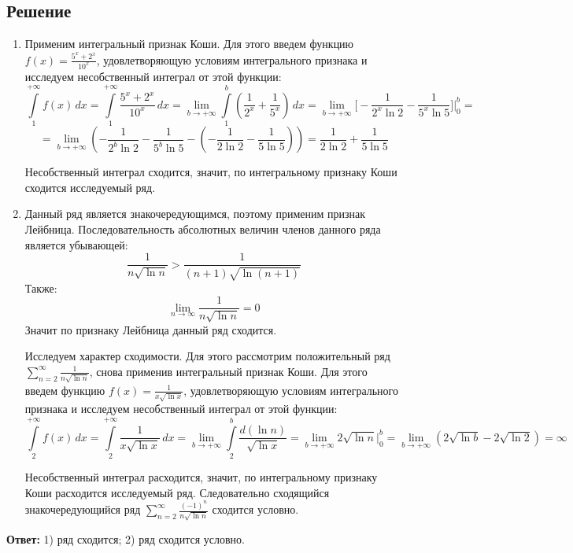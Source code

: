 \documentclass[12pt]{article}
\begin{document}
	\subsection*{Решение}
	\begin{enumerate}[wide, labelwidth=!, labelindent=0pt]
		\item Применим интегральный признак Коши. Для этого введем функцию $ f(x) = \frac{5^x + 2^x}{10^x} $, удовлетворяющую условиям интегрального признака и исследуем несобственный интеграл от этой функции:		
		$$ \int \limits_1^{+ \infty} f(x) \, dx = \int \limits_1^{+ \infty} \frac{5^x + 2^x}{10^x} \, dx = \lim_{b \to + \infty} \int \limits_1^b ( \frac{1}{2^x} + \frac{1}{5^x}) \, dx = \lim_{b \to + \infty} \Big[ - \frac{1}{ 2^x \ln{2} } - \frac{1}{ 5^x \ln{5} } \Big] \Big|_0^b = $$
		$$ = \lim_{b \to + \infty} ( - \frac{1}{ 2^b \ln{2} } - \frac{1}{ 5^b \ln{5} } - (- \frac{1}{ 2 \ln{2} } - \frac{1}{ 5 \ln{5} } ) )  =  \frac{1}{ 2 \ln{2} } + \frac{1}{ 5 \ln{5} }$$

		Несобственный интеграл сходится, значит, по интегральному признаку Коши сходится исследуемый ряд. 

		\item Данный ряд является знакочередующимся, поэтому применим признак Лейбница. Последовательность абсолютных величин членов данного ряда является убывающей:
		$$ \frac{1}{n\sqrt{\ln{n}}} > \frac{1}{(n+1)\sqrt{\ln{(n+1)}}} $$		
		Также:
		$$ \lim_{n \to \infty} \frac{1}{n\sqrt{\ln{n}}} = 0 $$
		Значит по признаку Лейбница данный ряд сходится.

		Исследуем характер сходимости. Для этого рассмотрим положительный ряд $ \sum_{n=2}^{\infty} \frac{1}{n\sqrt{\ln{n}}} $, снова применив интегральный признак Коши. Для этого введем функцию $ f(x) = \frac{1}{x\sqrt{\ln{x}}} $, удовлетворяющую условиям интегрального признака и исследуем несобственный интеграл от этой функции:
		$$ \int \limits_2^{+ \infty} f(x) \, dx = \int \limits_2^{+ \infty} \frac{1}{x\sqrt{\ln{x}}} \, dx = \lim_{b \to + \infty} \int \limits_2^b \frac{d(\ln{n})}{\sqrt{\ln{x}}} = \lim_{b \to + \infty} 2\sqrt{\ln{n}} \Big|_0^b = \lim_{b \to + \infty} ( 2\sqrt{\ln{b}} - 2\sqrt{\ln{2}} ) = \infty $$

		Несобственный интеграл расходится, значит, по интегральному признаку Коши расходится исследуемый ряд. Следовательно сходящийся знакочередующийся ряд $ \sum_{n=2}^{\infty} \frac{(-1)^n}{n\sqrt{\ln{n}}} $ сходится условно. 		
	\end{enumerate}

	\hspace{200pt}\textbf{Ответ:} 1) ряд сходится; 2) ряд сходится условно.
\end{document}
